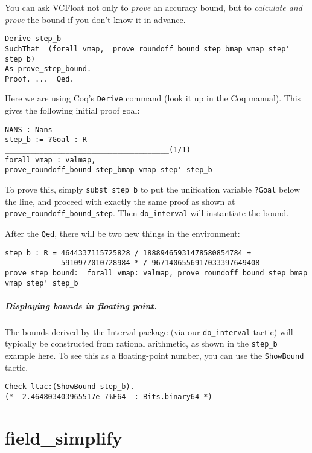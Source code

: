 \documentclass[article]{memoir}
\begin{document}
You can ask VCFloat not only to \emph{prove} an accuracy bound,
but to \emph{calculate and prove} the bound if you don't know it
in advance.

\begin{lstlisting}
Derive step_b 
SuchThat  (forall vmap,  prove_roundoff_bound step_bmap vmap step' step_b)
As prove_step_bound.
Proof. ...  Qed.
\end{lstlisting}
Here we are using Coq's \lstinline{Derive} command (look it up in the
Coq manual).  This gives the following initial proof goal:

\begin{lstlisting}
NANS : Nans
step_b := ?Goal : R
______________________________________(1/1)
forall vmap : valmap,
prove_roundoff_bound step_bmap vmap step' step_b
\end{lstlisting}

To prove this, simply \lstinline{subst step_b} to put the
unification variable \lstinline{?Goal} below the line,
and proceed with exactly the same proof as
shown at \lstinline{prove_roundoff_bound_step}.
Then \lstinline{do_interval} will instantiate the bound.

After the \lstinline{Qed}, there will be two new things
in the environment:
\begin{lstlisting}
step_b : R = 4644337115725828 / 18889465931478580854784 +
             5910977010728984 * / 9671406556917033397649408
prove_step_bound:  forall vmap: valmap, prove_roundoff_bound step_bmap vmap step' step_b
\end{lstlisting}

\paragraph{Displaying bounds in floating point.}
The bounds derived by the Interval package (via our \lstinline{do_interval}
tactic) will typically be constructed from rational arithmetic,
as shown in the \lstinline{step_b} example here.
To see this as a floating-point number, you can use the \lstinline{ShowBound} tactic.
\begin{lstlisting}
Check ltac:(ShowBound step_b).
(*  2.464803403965517e-7%F64  : Bits.binary64 *)
\end{lstlisting}


\chapter{field\_simplify}
\end{document}
